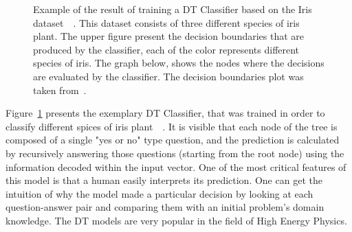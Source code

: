 \begin{figure}%
    \centering
    \qquad
    \caption{Example of the result of training a DT Classifier based on the Iris dataset~\cite{fisher}~\cite{anderson}. This dataset consists of three different species of iris plant. The upper figure present the decision boundaries that are produced by the classifier, each of the color represents different species of iris. The graph below, shows the nodes where the decisions are evaluated by the classifier. The decision boundaries plot was taken from~\cite{DecisionTrees}. }%
    \label{fig:Decision Tree}%
\end{figure}

Figure~\ref{fig:Decision Tree} presents the exemplary DT Classifier, that was trained in order to classify different spices of iris plant~\cite{fisher}~\cite{anderson}. It is visible that each node of the tree is composed of a single "yes or no" type question, and the prediction is calculated by recursively answering those questions (starting from the root node) using the information decoded within the input vector. One of the most critical features of this model is that a human easily interprets its prediction. One can get the intuition of why the model made a particular decision by looking at each question-answer pair and comparing them with an initial problem's domain knowledge. The DT models are very popular in the field of High Energy Physics.

